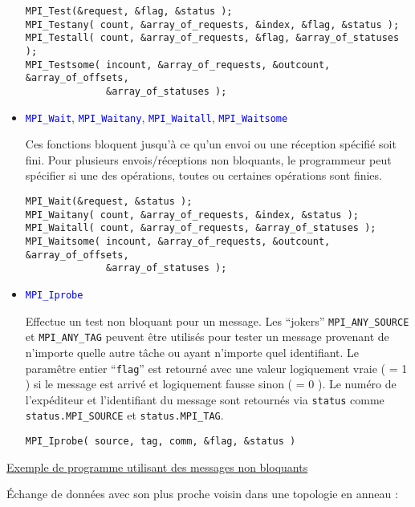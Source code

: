 \documentclass[11pt,a4paper]{article}
\begin{document}
\begin{itemize}
\begin{lstlisting}[style=customcpp]
MPI_Test(&request, &flag, &status );
MPI_Testany( count, &array_of_requests, &index, &flag, &status );
MPI_Testall( count, &array_of_requests, &flag, &array_of_statuses );
MPI_Testsome( incount, &array_of_requests, &outcount, &array_of_offsets, 
              &array_of_statuses );
\end{lstlisting}

\item \textcolor{blue}{\texttt{MPI\_Wait}, \texttt{MPI\_Waitany}, \texttt{MPI\_Waitall}, \texttt{MPI\_Waitsome}}

Ces fonctions bloquent jusqu'à ce qu'un envoi ou une réception spécifié soit fini. Pour plusieurs envois/réceptions
non bloquants, le programmeur peut spécifier si une des opérations, toutes ou certaines opérations sont finies.

\begin{lstlisting}[style=customcpp]
MPI_Wait(&request, &status );
MPI_Waitany( count, &array_of_requests, &index, &status );
MPI_Waitall( count, &array_of_requests, &array_of_statuses );
MPI_Waitsome( incount, &array_of_requests, &outcount, &array_of_offsets, 
              &array_of_statuses );
\end{lstlisting}

\item \textcolor{blue}{\texttt{MPI\_Iprobe}}

Effectue un test non bloquant pour un message. Les ``jokers'' \texttt{MPI\_ANY\_SOURCE} et \texttt{MPI\_ANY\_TAG}
peuvent être utilisés pour tester un message provenant de n'importe quelle autre tâche ou ayant n'importe
quel identifiant. Le paramêtre entier ``\texttt{flag}'' est retourné avec une valeur logiquement vraie ( = 1 )
si le message est arrivé et logiquement fausse sinon ( = 0 ). Le numéro de l'expéditeur et l'identifiant du
message sont retournés via \texttt{status} comme \texttt{status.MPI\_SOURCE} et \texttt{status.MPI\_TAG}.

\begin{lstlisting}[style=customcpp]
MPI_Iprobe( source, tag, comm, &flag, &status )
\end{lstlisting}

\end{itemize}

\underline{Exemple de programme utilisant des messages non bloquants}

\'Echange de données avec son plus proche voisin dans une topologie en anneau :
\end{document}
